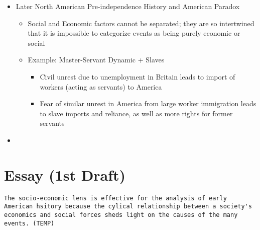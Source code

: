 \documentclass[letterpaper]{article}
\begin{document}
\begin{itemize}
\item Later North American Pre-independence History and American Paradox

\begin{itemize}
\item Social and Economic factors cannot be separated; they are so
intertwined that it is impossible to categorize events as being
purely economic or social
\item Example: Master-Servant Dynamic + Slaves

\begin{itemize}
\item Civil unrest due to unemployment in Britain leads to import of
workers (acting as servants) to America
\item Fear of similar unrest in America from large worker immigration
leads to slave imports and reliance, as well as more rights for
former servants
\end{itemize}
\end{itemize}

\item 
\end{itemize}

\section{Essay (1st Draft)}
\label{sec:org59355fa}
\begin{verbatim}
The socio-economic lens is effective for the analysis of early American hsitory because the cylical relationship between a society's economics and social forces sheds light on the causes of the many events. (TEMP)
\end{verbatim}
\end{document}
